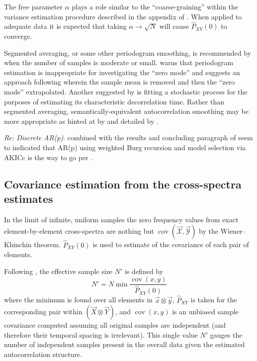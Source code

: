 \documentclass[letterpaper,11pt,nointlimits,reqno]{amsart}
\DeclareMathOperator{\cov}{cov}
\begin{document}
The free parameter $\alpha$ plays a role similar to the ``coarse-graining''
within the variance estimation procedure described in the appendix of
\citet{Hoyas2008Reynolds}.  When applied to adequate data it is expected that
taking $\alpha\to\sqrt{N}$ will cause $\hat{P}_{XY}(0)$ to converge.

Segmented averaging, or some other periodogram smoothing, is recommended by
\citet[\textsection{}17.1.3]{Storch2001Statistical} when the number of samples
is moderate or small.  \citet[\textsection{}12.3.7]{Storch2001Statistical}
warns that periodogram estimation is inappropriate for investigating the ``zero
mode'' and suggests an approach following \citet{Madden1976Estimates} wherein
the sample mean is removed and then the ``zero mode'' extrapolated.  Another
suggested by \citet[\textsection{}17.1.3]{Storch2001Statistical} is fitting a
stochastic process for the purposes of estimating its characteristic
decorrelation time.  Rather than segmented averaging, semantically-equivalent
autocorrelation smoothing may be more appropriate as hinted at by
\citet{Scargle1982Studies} and detailed by \citet{Richards1967Computing}.

\emph{Re: Discrete AR(p)}.  \citet{Storch2001Statistical} combined with the
results and concluding paragraph of \citet{Campbell1993Frequency} seem to
indicated that AR(p) using weighted Burg recursion and model selection via
AKICc is the way to go per \citep{Seghouane2004Small, Ibrahim1989Correction,
Ibrahim1987Line, Ibrahim1987Improvement, Swingler1991Frequency,
Campbell1993Frequency}.

\subsection*{Covariance estimation from the cross-spectra estimates}

In the limit of infinite, uniform samples the zero frequency values from exact
element-by-element cross-spectra are nothing but $\cov\left( \vec{\mathscr{X}}
, \vec{\mathscr{Y}} \right)$ by the Wiener--Khinchin theorem.
$\hat{P}_{XY}(0)$ is used to estimate of the covariance of each pair of
elements.

Following \citet{Thiebaux1984Interpretation}, the effective sample size $N'$ is
defined by
$$
    N' = N \min \frac{\cov(x,y)} {\hat{P}_{XY}(0)}
$$
where the minimum is found over all elements in $\vec{x}\otimes\vec{y}$,
$\hat{P}_{XY}$ is taken for the corresponding pair within $\left(\vec{X}
\otimes \vec{Y} \right)$, and $\cov(x,y)$ is an unbiased sample covariance
computed assuming all original samples are independent (and therefore their
temporal spacing is irrelevant).  This single value $N'$ gauges the number of
independent samples present in the overall data given the estimated
autocorrelation structure.
\end{document}
